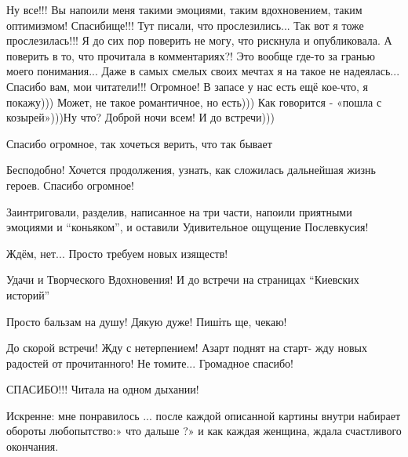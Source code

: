  
 
 
 
 
\zzSecCmt

\begin{itemize} %



Ну все!!! Вы напоили меня такими эмоциями, таким вдохновением, таким оптимизмом!
Спасибище!!! Тут писали, что прослезились... Так вот я тоже прослезилась!!! Я до
сих пор поверить не могу, что рискнула и опубликовала. А поверить в то, что
прочитала в комментариях?! Это вообще где-то за гранью моего понимания... Даже в
самых смелых своих мечтах я на такое не надеялась... Спасибо вам, мои читатели!!!
Огромное! В запасе у нас есть ещё кое-что, я покажу))) Может, не такое
романтичное, но есть))) Как говорится - «пошла с козырей»)))Ну что? Доброй ночи
всем! И до встречи)))

Спасибо огромное, так хочеться верить, что так бывает

Бесподобно! Хочется продолжения, узнать, как сложилась дальнейшая жизнь героев.
Спасибо огромное!


Заинтриговали, разделив, написанное на три части, напоили приятными эмоциями и
\enquote{коньяком}, и оставили Удивительное ощущение Послевкусия!

Ждём, нет... Просто требуем новых изяществ!

Удачи и Творческого Вдохновения! И до встречи на страницах \enquote{Киевских историй}

Просто бальзам на душу! Дякую дуже! Пишіть ще, чекаю!


До скорой встречи! Жду с нетерпением! Азарт поднят на старт- жду новых радостей
от прочитанного! Не томите... Громадное спасибо!

СПАСИБО!!! Читала на одном дыхании!


Искренне: мне понравилось ... после каждой описанной картины внутри набирает
обороты любопытство:» что дальше ?» и как каждая женщина, ждала счастливого
окончания.


\end{itemize}
